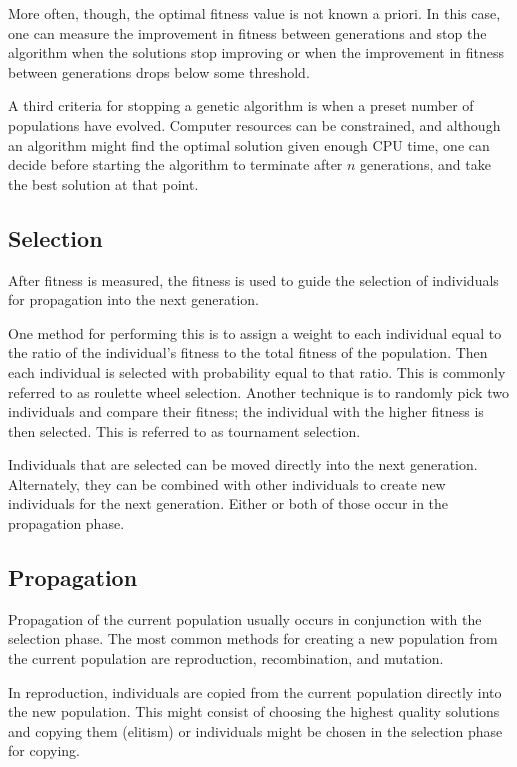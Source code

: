 More often, though, the optimal fitness value is not known a priori. In this
case, one can measure the improvement in fitness between generations and stop
the algorithm when the solutions stop improving or when the improvement in
fitness between generations drops below some threshold.

A third criteria for stopping a genetic algorithm is when a preset number of
populations have evolved. Computer resources can be constrained, and although
an algorithm might find the optimal solution given enough CPU time, one can 
decide before starting the algorithm to terminate after \(n\) generations, and
take the best solution at that point.

\subsection{Selection}

After fitness is measured, the fitness is used to guide the selection of
individuals for propagation into the next generation. 

One method for performing this is to assign a weight to each individual
equal to the ratio of the individual's fitness to the total fitness of the
population. Then each individual is selected with probability equal to that
ratio. This is commonly referred to as roulette wheel selection. Another
technique is to randomly pick two individuals and compare their fitness; the
individual with the higher fitness is then selected. This is referred to as
tournament selection. 

Individuals that are selected can be moved directly into the next generation.
Alternately, they can be combined with other individuals to create new
individuals for the next generation. Either or both of those occur in the
propagation phase.

\subsection{Propagation}

Propagation of the current population usually occurs in conjunction with the
selection phase. The most common methods for creating a new population from the
current population are reproduction, recombination, and mutation.

In reproduction, individuals are copied from the current population directly
into the new population. This might consist of choosing the highest quality
solutions and copying them (elitism) or individuals might be chosen in the
selection phase for copying.

